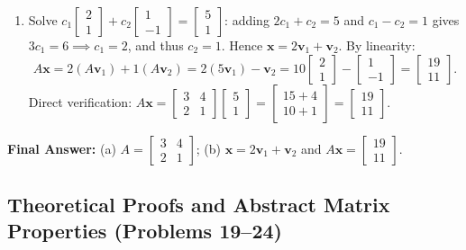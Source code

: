 \documentclass[11pt, letterpaper]{article}
\theoremstyle{definition}
\theoremstyle{remark}
\begin{document}
\begin{enumerate}[label=(\alph*)]
    \item Solve $c_1 \begin{bmatrix} 2 \\ 1 \end{bmatrix} + c_2 \begin{bmatrix} 1 \\ -1 \end{bmatrix} = \begin{bmatrix} 5 \\ 1 \end{bmatrix}$: adding $2c_1 + c_2 = 5$ and $c_1 - c_2 = 1$ gives $3c_1 = 6 \implies c_1 = 2$, and thus $c_2 = 1$. Hence $\mathbf{x} = 2\mathbf{v}_1 + \mathbf{v}_2$. By linearity:
    \[
    A\mathbf{x} = 2(A\mathbf{v}_1) + 1(A\mathbf{v}_2) = 2(5\mathbf{v}_1) - \mathbf{v}_2 = 10\begin{bmatrix} 2 \\ 1 \end{bmatrix} - \begin{bmatrix} 1 \\ -1 \end{bmatrix} = \begin{bmatrix} 19 \\ 11 \end{bmatrix}.
    \]
    Direct verification: $A\mathbf{x} = \begin{bmatrix} 3 & 4 \\ 2 & 1 \end{bmatrix}\begin{bmatrix} 5 \\ 1 \end{bmatrix} = \begin{bmatrix} 15 + 4 \\ 10 + 1 \end{bmatrix} = \begin{bmatrix} 19 \\ 11 \end{bmatrix}$.
\end{enumerate}
\textbf{Final Answer:} (a) $A = \begin{bmatrix} 3 & 4 \\ 2 & 1 \end{bmatrix}$; (b) $\mathbf{x} = 2\mathbf{v}_1 + \mathbf{v}_2$ and $A\mathbf{x} = \begin{bmatrix} 19 \\ 11 \end{bmatrix}$.

\subsection{Theoretical Proofs and Abstract Matrix Properties (Problems 19--24)}
\end{document}
